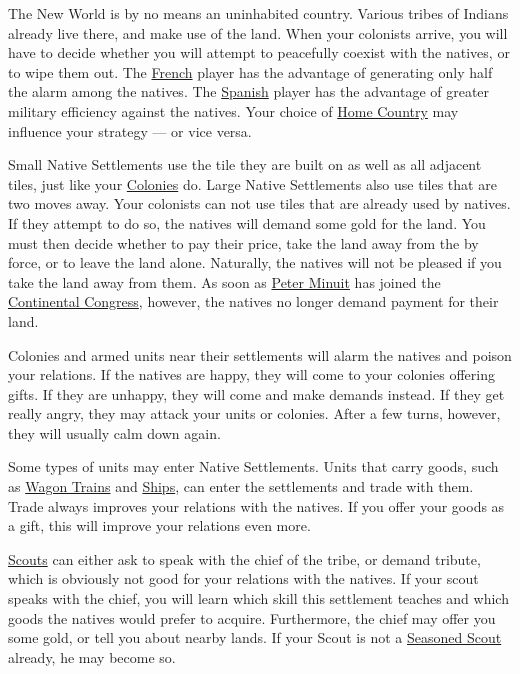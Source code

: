 \documentclass[12pt]{book}
\begin{document}
The New World is by no means an uninhabited country. Various tribes of
Indians already live there, and make use of the land. When your
colonists arrive, you will have to decide whether you will attempt to
peacefully coexist with the natives, or to wipe them out. The
\hyperlink{France}{French} player has the advantage of generating only
half the alarm among the natives. The \hyperlink{Spain}{Spanish}
player has the advantage of greater military efficiency against the
natives. Your choice of \hyperlink{Home Country}{Home Country} may
influence your strategy --- or vice versa.

Small Native Settlements use the tile they are built on as well as all
adjacent tiles, just like your \hyperlink{Colonies}{Colonies}
do. Large Native Settlements also use tiles that are two moves
away. Your colonists can not use tiles that are already used by
natives. If they attempt to do so, the natives will demand some gold
for the land. You must then decide whether to pay their price, take
the land away from the by force, or to leave the land alone.
Naturally, the natives will not be pleased if you take the land away
from them. As soon as \hyperlink{Peter Minuit}{Peter Minuit} has
joined the \hyperlink{Continental Congress}{Continental Congress},
however, the natives no longer demand payment for their land.

Colonies and armed units near their settlements will alarm the natives
and poison your relations. If the natives are happy, they will come to
your colonies offering gifts. If they are unhappy, they will come and
make demands instead. If they get really angry, they may attack your
units or colonies. After a few turns, however, they will usually calm
down again.

Some types of units may enter Native Settlements. Units that carry
goods, such as \hyperlink{Wagon Train}{Wagon Trains} and
\hyperlink{Naval Units}{Ships}, can enter the settlements and trade
with them. Trade always improves your relations with the natives. If
you offer your goods as a gift, this will improve your relations even
more.

\hyperlink{Scout}{Scouts} can either ask to speak with the chief of
the tribe, or demand tribute, which is obviously not good for your
relations with the natives. If your scout speaks with the chief, you
will learn which skill this settlement teaches and which goods the
natives would prefer to acquire. Furthermore, the chief may offer you
some gold, or tell you about nearby lands. If your Scout is not a
\hyperlink{Seasoned Scout}{Seasoned Scout} already, he may become so.
\end{document}
